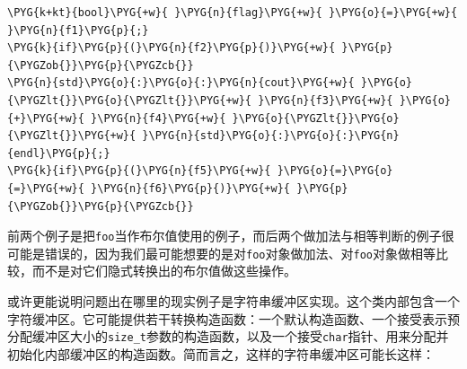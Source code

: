 
\begin{codeblockbg}
\begin{Verbatim}[commandchars=\\\{\},breaklines=true,breakanywhere=true,fontsize=\codefont,xleftmargin=17bp]
\PYG{k+kt}{bool}\PYG{+w}{ }\PYG{n}{flag}\PYG{+w}{ }\PYG{o}{=}\PYG{+w}{ }\PYG{n}{f1}\PYG{p}{;}
\PYG{k}{if}\PYG{p}{(}\PYG{n}{f2}\PYG{p}{)}\PYG{+w}{ }\PYG{p}{\PYGZob{}}\PYG{p}{\PYGZcb{}}
\PYG{n}{std}\PYG{o}{:}\PYG{o}{:}\PYG{n}{cout}\PYG{+w}{ }\PYG{o}{\PYGZlt{}}\PYG{o}{\PYGZlt{}}\PYG{+w}{ }\PYG{n}{f3}\PYG{+w}{ }\PYG{o}{+}\PYG{+w}{ }\PYG{n}{f4}\PYG{+w}{ }\PYG{o}{\PYGZlt{}}\PYG{o}{\PYGZlt{}}\PYG{+w}{ }\PYG{n}{std}\PYG{o}{:}\PYG{o}{:}\PYG{n}{endl}\PYG{p}{;}
\PYG{k}{if}\PYG{p}{(}\PYG{n}{f5}\PYG{+w}{ }\PYG{o}{=}\PYG{o}{=}\PYG{+w}{ }\PYG{n}{f6}\PYG{p}{)}\PYG{+w}{ }\PYG{p}{\PYGZob{}}\PYG{p}{\PYGZcb{}}
\end{Verbatim}
\end{codeblockbg}



前两个例子是把\texttt{foo}当作布尔值使用的例子，而后两个做加法与相等判断的例子很可能是错误的，因为我们最可能想要的是对\texttt{foo}对象做加法、对\texttt{foo}对象做相等比较，而不是对它们隐式转换出的布尔值做这些操作。



或许更能说明问题出在哪里的现实例子是字符串缓冲区实现。这个类内部包含一个字符缓冲区。它可能提供若干转换构造函数：一个默认构造函数、一个接受表示预分配缓冲区大小的\texttt{size\_\allowbreak{}t}参数的构造函数，以及一个接受\texttt{char}指针、用来分配并初始化内部缓冲区的构造函数。简而言之，这样的字符串缓冲区可能长这样：



